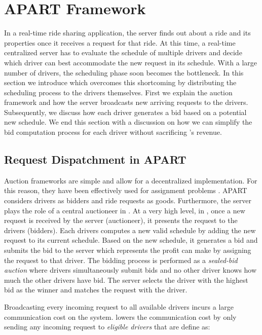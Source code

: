 \section{APART Framework}
\label{sec:framework}

In a real-time ride sharing application, the server finds out about a ride and its properties once it receives a request for that ride. At this time, a real-time centralized server has to evaluate the schedule of multiple drivers and decide which driver can best accommodate the new request in its schedule. With a large number of drivers, the scheduling phase soon becomes the bottleneck. In this section we introduce \fname which overcomes this shortcoming by distributing the scheduling process to the drivers themselves. First we explain the auction framework and how the server broadcasts new arriving requests to the drivers. Subsequently, we discuss how each driver generates a bid based on a potential new schedule. We end this section with a discussion on how we can simplify the bid computation process for each driver without sacrificing \fname 's revenue.

\subsection{Request Dispatchment in APART}
\label{subsec:dispatch}

Auction frameworks are simple and allow for a decentralized implementation. For this reason, they have been effectively used for assignment problems \cite{Lagoudakis04,Mehta05}. APART considers drivers as bidders and ride requests as goods. Furthermore, the server plays the role of a central auctioneer in \fname. At a very high level, in \fname, once a new request is received by the server (auctioneer), it presents the request to the drivers (bidders). Each drivers computes a new valid schedule by adding the new request to its current schedule. Based on the new schedule, it generates a bid and submits the bid to the server which represents the profit \fname can make by assigning the request to that driver. The bidding process is performed as a \textit{sealed-bid auction} where drivers simultaneously submit bids and no other driver knows how much the other drivers have bid. The server selects the driver with the highest bid as the winner and matches the request with the driver.

Broadcasting every incoming request to all available drivers incurs a large communication cost on the system. \fname lowers the communication cost by only sending any incoming request to \textit{eligible drivers} that are define as:


